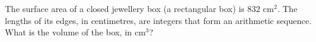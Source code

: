 The surface area of a closed jewellery box (a rectangular box) is $832\text{ cm}^2$. The lengths of its edges, in centimetres, are integers that form an arithmetic sequence. What is the volume of the box, in $\text{cm}^3$?
